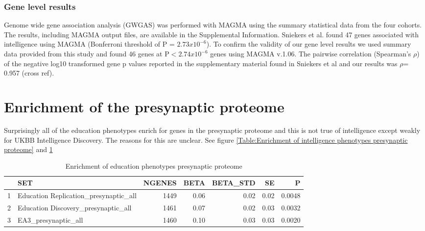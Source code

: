 

\subsubsection{Gene level results}

Genome wide gene association analysis (GWGAS) was performed with MAGMA using the summary statistical data from the four cohorts. The results, including MAGMA output files, are available in the Supplemental Information.
Sniekers et al. found 47 genes associated with intelligence using MAGMA (Bonferroni threshold of P = $2.73 x 10^{-6}$). \cite{sniekers2017genome}  To confirm the validity of our gene level results we used summary data provided from this study and found 46 genes at  P$<2.74 x 10^{-6}$ genes using MAGMA v.1.06.  The pairwise correlation (Spearman’s $\rho$) of the negative log10 transformed gene p values reported in the supplementary material found in Sniekers et al and our results was $\rho$= 0.957\cite{sniekers2017genome} (cross ref). 



 \section{Enrichment of the presynaptic proteome}
 
 Surprisingly all of the education phenotypes enrich for genes in the presynaptic proteome and this is not true of intelligence except weakly for UKBB Intelligence Discovery. The reasons for this are unclear. See figure \ref{Table:Enrichment of intelligence phenotypes presynaptic proteome} and \ref{Table:Enrichment of education phenotypes presynaptic proteome}
 


\begin{table}
\centering
\begin{tabular}{rlrrrrr}
  \hline
 & SET & NGENES & BETA & BETA\_STD & SE & P \\ 
  \hline
1 & Education Replication\_presynaptic\_all & 1449 & 0.06 & 0.02 & 0.02 & 0.0048 \\ 
  2 & Education Discovery\_presynaptic\_all & 1461 & 0.07 & 0.02 & 0.03 & 0.0032 \\ 
  3 & EA3\_presynaptic\_all & 1460 & 0.10 & 0.03 & 0.03 & 0.0020 \\ 
   \hline
\end{tabular}
\caption{Enrichment of education phenotypes presynaptic proteome} 
\label{Table:Enrichment of education phenotypes presynaptic proteome}
\end{table}




